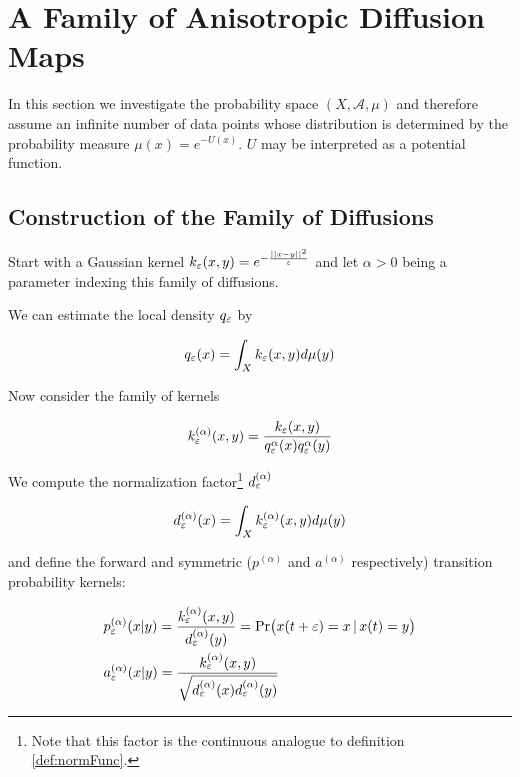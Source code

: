 \section{A Family of Anisotropic Diffusion Maps}

In this section we investigate the probability space $(X, \mathcal{A}, \mu)$ and therefore assume an infinite number of data points whose distribution is determined by the probability measure $\mu(x)=e^{-U(x)}$. $U$ may be interpreted as a potential function.

\subsection{Construction of the Family of Diffusions}
Start with a Gaussian kernel $k_\varepsilon(x,y)=e^{-\frac{||x-y||^2}{\varepsilon}}$ and let $\alpha > 0$ being a parameter indexing this family of diffusions.

We can estimate the local density $q_\varepsilon$ by 

\begin{definition}
$$q_\varepsilon(x)=\int_X k_\varepsilon(x,y)d\mu(y)$$
\end{definition}

Now consider the family of kernels

\begin{definition}
$$k_\varepsilon^{(\alpha)}(x,y)=\frac{k_\varepsilon(x,y)}{q_\varepsilon^\alpha(x)q_\varepsilon^\alpha(y)} $$
\end{definition}

We compute the normalization factor\footnote{Note that this factor is the continuous analogue to definition \ref{def:normFunc}.} $d_\varepsilon^{(\alpha)}$

$$d_\varepsilon^{(\alpha)}(x) = \int_X k_\varepsilon^{(\alpha)}(x,y)d\mu(y)$$

and define the forward and symmetric ($p^{(\alpha)}$ and $a^{(\alpha)}$ respectively) transition probability kernels:

\begin{definition}\begin{equation*}\begin{aligned}
&p_\varepsilon^{(\alpha)}(x|y) = \frac{k_\varepsilon^{(\alpha)}(x,y)}{d_\varepsilon^{(\alpha)}(y)} = \text{Pr}\big(x(t+\varepsilon)=x \, |\, x(t)=y\big)\\
&a_\varepsilon^{(\alpha)}(x|y) = \frac{k_\varepsilon^{(\alpha)}(x,y)}{\sqrt{d_\varepsilon^{(\alpha)}(x)d_\varepsilon^{(\alpha)}(y)}}
\end{aligned}\end{equation*}\end{definition}

